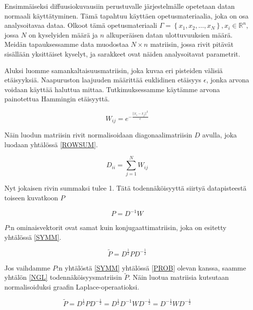 Ensimmäiseksi diffuusiokuvausiin perustuvalle järjestelmälle opetetaan datan normaali käyttätyminen. Tämä tapahtuu käyttäen opetusmateriaalia, joka on osa analysoitavaa dataa. Olkoot tämä opetusmateriaali 
$\Gamma = \left\{ x_1, x_2, \dots , x_N \right\}, x_i \in \mathbb{R}^n$, jossa $N$ on kyselyiden määrä ja $n$ alkuperäisen datan ulottuvuuksien määrä. Meidän tapauksessamme data muodostaa $N \times n$ matriisin, jossa 
rivit pitävät sisällään yksittäiset kyselyt, ja sarakkeet ovat näiden analysoitavat parametrit.

Aluksi luomme samankaltaisuusmatriisin, joka kuvaa eri pisteiden välisiä etäisyyksiä. Naapuruston laajuuden määrittää euklidinen etäisyys $\epsilon$, jonka arvona voidaan käyttää haluttua mittaa. Tutkimuksessamme käytämme arvona painotettua Hammingin etäisyyttä.

\begin{equation}
W_{ij} = e^{-\frac{||x_i - x_j||^2}{\epsilon}}
\label{KERNEL}
\end{equation}

Näin luodun matriisin rivit normalisoidaan diagonaalimatriisin $D$ avulla, joka luodaan yhtälössä \ref{ROWSUM}. 

\begin{equation}
D_{ii} = \sum_{j=1}^{N} W_{ij}
\label{ROWSUM}
\end{equation}

Nyt jokaisen rivin summaksi tulee 1. Tätä todennäköisyyttä siirtyä datapisteestä toiseen kuvatkoon $P$

\begin{equation}
P = D^{-1} W
\label{PROB}
\end{equation}

$P$:n ominaisvektorit ovat samat kuin konjugaattimatriisin, joka on esitetty yhtälössä \ref{SYMM}. 

\begin{equation}
\tilde{P} = D^{\frac{1}{2}} P D^{-\frac{1}{2}}
\label{SYMM}
\end{equation}

Jos vaihdamme $P$:n yhtälöstä \ref{SYMM} yhtälössä \ref{PROB} olevan kanssa, saamme yhtälön \ref{NGL} todennäköisyysmatriisin $\tilde{P}$. Näin luotua matriisia kutsutaan normalisoiduksi graafin  Laplace-operaatioksi.

\begin{equation}
\tilde{P} = D^{\frac{1}{2}} P D^{-\frac{1}{2}} = D^{\frac{1}{2}} D^{-1} W D^{-\frac{1}{2}} = D^{-\frac{1}{2}} W D^{-\frac{1}{2}}
\label{NGL}
\end{equation}

